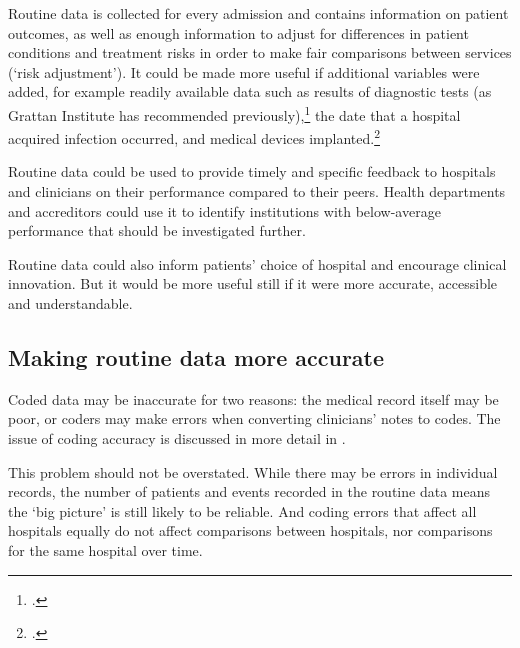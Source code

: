 \documentclass[FrontPage]{grattan}
\begin{document}
Routine data is collected for every admission and contains information on patient outcomes, as well as enough information to adjust for differences in patient conditions and treatment risks in order to make fair comparisons between services (‘risk adjustment’). It could be made more useful if additional variables were added, for example readily available data such as results of diagnostic tests (as Grattan Institute has recommended previously),\footcite{DuckettEtAl-2015-Questionable-care}
the date that a hospital acquired infection occurred, and medical devices implanted.\footcite{RN22}

Routine data could be used to provide timely and specific feedback to hospitals and clinicians on their performance compared to their peers. Health departments and accreditors could use it to identify institutions with below-average performance that should be investigated further. 

Routine data could also inform patients’ choice of hospital and encourage clinical innovation. But it would be more useful still if it were more accurate, accessible and understandable.

\subsection{Making routine data more accurate}\label{subsec:accurate}
Coded data may be inaccurate for two reasons: the medical record itself may be poor, or coders may make errors when converting clinicians’ notes to codes. The issue of coding accuracy is discussed in more detail in .

This problem should not be overstated. While there may be errors in individual records, the number of patients and events recorded in the routine data means the ‘big picture’ is still likely to be reliable. And coding errors that affect all hospitals equally do not affect comparisons between hospitals, nor comparisons for the same hospital over time.
\end{document}
